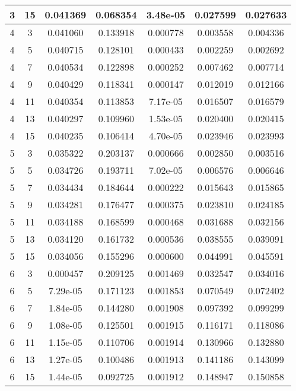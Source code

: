 \begin{longtable}{|c|c|c|c|c|c|c|}
	\hline 3 &	15 &	0.041369 &	0.068354 &	3.48e-05 &	0.027599 &	0.027633 \\
	\hline \rowcolor{closest} 4 &	3 &	0.041060 &	0.133918 &	0.000778 &	0.003558 &	0.004336 \\
	\hline 4 &	5 &	0.040715 &	0.128101 &	0.000433 &	0.002259 &	0.002692 \\
	\hline 4 &	7 &	0.040534 &	0.122898 &	0.000252 &	0.007462 &	0.007714 \\
	\hline 4 &	9 &	0.040429 &	0.118341 &	0.000147 &	0.012019 &	0.012166 \\
	\hline 4 &	11 &	0.040354 &	0.113853 &	7.17e-05 &	0.016507 &	0.016579 \\
	\hline 4 &	13 &	0.040297 &	0.109960 &	1.53e-05 &	0.020400 &	0.020415 \\
	\hline 4 &	15 &	0.040235 &	0.106414 &	4.70e-05 &	0.023946 &	0.023993 \\
	\hline \rowcolor{closest} 5 &	3 &	0.035322 &	0.203137 &	0.000666 &	0.002850 &	0.003516 \\
	\hline 5 &	5 &	0.034726 &	0.193711 &	7.02e-05 &	0.006576 &	0.006646 \\
	\hline 5 &	7 &	0.034434 &	0.184644 &	0.000222 &	0.015643 &	0.015865 \\
	\hline 5 &	9 &	0.034281 &	0.176477 &	0.000375 &	0.023810 &	0.024185 \\
	\hline 5 &	11 &	0.034188 &	0.168599 &	0.000468 &	0.031688 &	0.032156 \\
	\hline 5 &	13 &	0.034120 &	0.161732 &	0.000536 &	0.038555 &	0.039091 \\
	\hline 5 &	15 &	0.034056 &	0.155296 &	0.000600 &	0.044991 &	0.045591 \\
	\hline \rowcolor{closest} 6 &	3 &	0.000457 &	0.209125 &	0.001469 &	0.032547 &	0.034016 \\
	\hline 6 &	5 &	7.29e-05 &	0.171123 &	0.001853 &	0.070549 &	0.072402 \\
	\hline 6 &	7 &	1.84e-05 &	0.144280 &	0.001908 &	0.097392 &	0.099299 \\
	\hline 6 &	9 &	1.08e-05 &	0.125501 &	0.001915 &	0.116171 &	0.118086 \\
	\hline 6 &	11 &	1.15e-05 &	0.110706 &	0.001914 &	0.130966 &	0.132880 \\
	\hline 6 &	13 &	1.27e-05 &	0.100486 &	0.001913 &	0.141186 &	0.143099 \\
	\hline 6 &	15 &	1.44e-05 &	0.092725 &	0.001912 &	0.148947 &	0.150858 \\
	\hline 
\end{longtable} 

